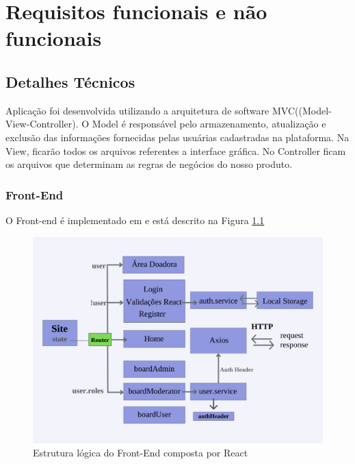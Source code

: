 \chapter{Requisitos funcionais e não funcionais}
\section{Detalhes Técnicos}
\label{sec:tech}

Aplicação foi desenvolvida utilizando a arquitetura de software MVC((Model-View-Controller).
O Model é responsável pelo armazenamento, atualização e exclusão das informações fornecidas pelas usuárias cadastradas na plataforma.
Na View, ficarão todos os arquivos referentes a interface gráfica.
No Controller ficam os arquivos que determinam as regras de negócios do nosso produto.

\subsection{Front-End}
O Front-end é implementado em \cite{React} e está descrito na Figura \ref{fig:logicFront}

\begin{figure}[h!]
    \centering
    \includegraphics[width=1.0\textwidth]{Figuras/Frontpdf.pdf}
    \caption{Estrutura lógica do Front-End composta por React}
    \label{fig:logicFront}
\end{figure}

